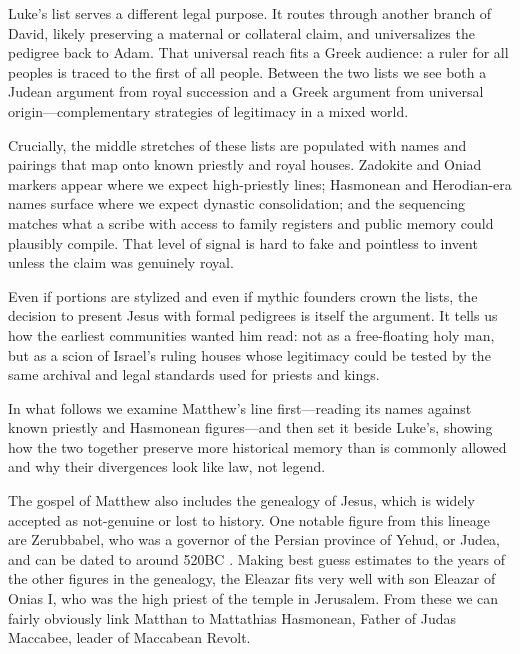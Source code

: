 Luke’s list serves a different legal purpose.
It routes through another branch of David, likely preserving a maternal or collateral claim, and universalizes the pedigree back to Adam.
That universal reach fits a Greek audience: a ruler for all peoples is traced to the first of all people.
Between the two lists we see both a Judean argument from royal succession and a Greek argument from universal origin—complementary strategies of legitimacy in a mixed world.

Crucially, the middle stretches of these lists are populated with names and pairings that map onto known priestly and royal houses.
Zadokite and Oniad markers appear where we expect high-priestly lines; Hasmonean and Herodian-era names surface where we expect dynastic consolidation; and the sequencing matches what a scribe with access to family registers and public memory could plausibly compile.
That level of signal is hard to fake and pointless to invent unless the claim was genuinely royal.

Even if portions are stylized and even if mythic founders crown the lists, the decision to present Jesus with formal pedigrees is itself the argument.
It tells us how the earliest communities wanted him read: not as a free-floating holy man, but as a scion of Israel’s ruling houses whose legitimacy could be tested by the same archival and legal standards used for priests and kings.

In what follows we examine Matthew’s line first—reading its names against known priestly and Hasmonean figures—and then set it beside Luke’s, showing how the two together preserve more historical memory than is commonly allowed and why their divergences look like law, not legend.

The gospel of Matthew also includes the genealogy of Jesus, which is widely accepted as not-genuine or lost to history.
One notable figure from this lineage are Zerubbabel, who was a governor of the Persian province of Yehud, or Judea, and can be dated to around 520BC .
Making best guess estimates to the years of the other figures in the genealogy, the Eleazar fits very well with son Eleazar of Onias I, who was the high priest of the temple in Jerusalem.
From these we can fairly obviously link Matthan to Mattathias Hasmonean, Father of Judas Maccabee, leader of Maccabean Revolt.

